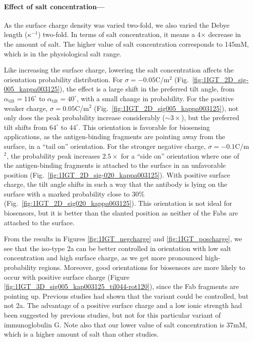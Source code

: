  \medskip
 
 \paragraph*{Effect of salt concentration---}
 
As the surface charge density was varied two-fold, we also varied the Debye length ($\kappa^{-1}$) two-fold. In terms of salt concentration, it means a 4$\times$ decrease in the amount of salt. The higher value of salt concentration corresponds to 145mM, which is in the physiological salt range.  
 
Like increasing the surface charge, lowering the salt concentration affects the orientation probability distribution. 
 For $\sigma=-0.05$C/m$^2$ (Fig.~\ref{fig:1IGT_2D_sig-005_kappa003125}), the effect is a large shift in the preferred tilt angle, from $\alpha_\text{tilt}=116^\circ$ to $\alpha_\text{tilt}=40^\circ$, with a small change in probability. 
For the positive weaker charge, $\sigma=0.05$C/m$^2$ (Fig.~\ref{fig:1IGT_2D_sig005_kappa003125}), not only does the peak probability increase considerably ($\sim 3\times$), but the preferred tilt shifts from $64^{\circ}$ to $44^{\circ}$.
This orientation is favorable for biosensing applications, as the antigen-binding fragments are pointing away from the surface, in a ``tail on'' orientation.
 For the stronger negative charge, $\sigma=-0.1$C/m$^2$, the probability peak increases  $2.5\times$ for a ``side on'' orientation where one of the antigen-binding fragments is attached to the surface in an unfavorable position (Fig.~\ref{fig:1IGT_2D_sig-020_kappa003125}).
 With positive surface charge, the tilt angle shifts in such a way that the antibody is lying on the surface with a marked probability close to $30\%$ (Fig.~\ref{fig:1IGT_2D_sig020_kappa003125}).
 This orientation is not ideal for biosensors, but it is better than the slanted position as neither of the Fabs are attached to the surface.

From the results in Figures \ref{fig:1IGT_negcharge} and \ref{fig:1IGT_poscharge}, we see that the iso-type \ig 2a can be better controlled in orientation with low salt concentration and high surface charge, as we get more pronounced high-probability regions. 
Moreover, good orientations for biosensors are more likely to occur with positive surface charge (Figure \ref{fig:1IGT_3D_sig005_kap003125_til044-rot120}), since the Fab fragments are pointing up.
Previous studies had shown that the  variant could be controlled, but not \ig 2a. 
The advantage of a positive surface charge and a low ionic strength had been suggested by previous studies, but not for this particular variant of immunoglobulin G. Note also that our lower value of salt concentration is 37mM, which is a higher amount of salt than other studies.\cite{BuijsETal1997,ChenLiuZhouJiang2003}


